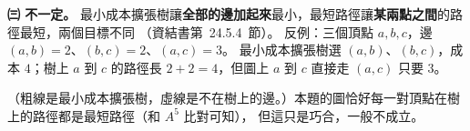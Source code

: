 \begin{pastsoln}
\textbf{㈢ 不一定。} 最小成本擴張樹讓\textbf{全部的邊加起來}最小，最短路徑讓\textbf{某兩點之間}的路徑最短，兩個目標不同
（資結書第~24.5.4~節）。 反例：三個頂點 $a, b, c$，邊 $(a,b) = 2$、$(b,c) = 2$、$(a,c) = 3$。 最小成本擴張樹選
$(a,b)$、$(b,c)$，成本 $4$；樹上 $a$ 到 $c$ 的路徑長 $2 + 2 = 4$，但圖上 $a$ 到 $c$ 直接走 $(a,c)$ 只要 $3$。
\begin{center}
\end{center}
（粗線是最小成本擴張樹，虛線是不在樹上的邊。）本題的圖恰好每一對頂點在樹上的路徑都是最短路徑（和 $A^5$ 比對可知），
但這只是巧合，一般不成立。
\end{pastsoln}
